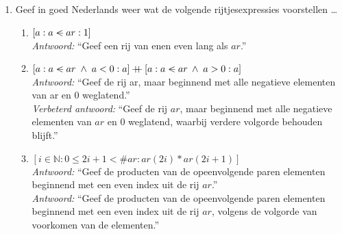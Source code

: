 
\begin{enumerate}

\item Geef in goed Nederlands weer wat  de volgende rijtjesexpressies voorstellen \ldots
\begin{enumerate}

    \item $[ a : a < \!\!\!\!\!\! - \: ar : 1 ] $ \\
        \emph{Antwoord:} ``Geef een rij van enen even lang als $ar$.'' \\

    \item $[ a: a \inr ar\; \land\; a<0 : a]\cat [a: a \inr ar \:\land \; a>0 : a]$ \\
        \emph{Antwoord:} ``Geef de rij ar, maar beginnend met alle negatieve elementen van ar en 0 weglatend.'' \\
        \emph{Verbeterd antwoord:} ``Geef de rij $ar$, maar beginnend met alle negatieve elementen van $ar$ en 0 weglatend, waarbij verdere volgorde behouden blijft.'' \\

    \item $[ i \in \mathbb{N}: 0 \leq 2i\!+\!1<\#ar : ar(2i) * ar(2i\!+\!1)]$ \\
        \emph{Antwoord:} ``Geef de producten van de opeenvolgende paren elementen beginnend met een even index uit de rij $ar$.'' \\
        \emph{Antwoord:} ``Geef de producten van de opeenvolgende paren elementen beginnend met een even index uit de rij $ar$, volgens de volgorde van voorkomen van de elementen.'' \\


\end{enumerate}
\end{enumerate}
